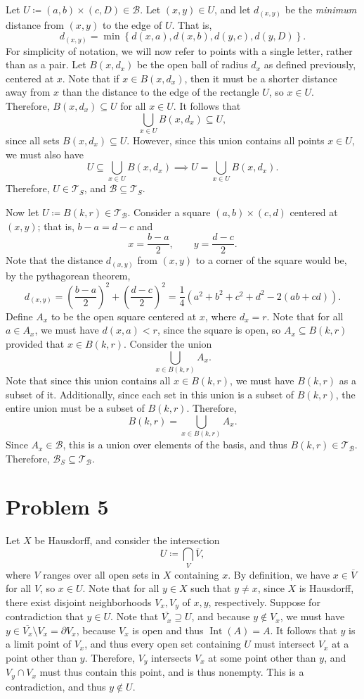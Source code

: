 \documentclass[11pt, letterpaper]{article}
\DeclareMathOperator{\Int}{Int}
\begin{document}
Let $U\coloneqq (a,b)\times (c,D)\in \mathcal{B}  $. Let $(x,y)\in U$, and let $d_{(x,y)} $ be the \emph{minimum} distance from $(x,y)$ to the edge of $U$. That is,
\[
	d_{(x,y)} = \min \left\{ d(x,a),d(x,b),d(y,c),d(y,D) \right\} 
.\]
For simplicity of notation, we will now refer to points with a single letter, rather than as a pair. Let $B(x,d_x)$ be the open ball of radius $d_x$ as defined previously, centered at $x$. Note that if $x\in B(x,d_x)$, then it must be a shorter distance away from $x$ than the distance to the edge of the rectangle $U$, so $x\in U$. Therefore, $B(x,d_x)\subseteq U$ for all $x\in U$. It follows that
\[
	\bigcup_{x\in U} B(x,d_x) \subseteq U
,\]
since all sets $B(x,d_x)\subseteq U$. However, since this union contains all points $x\in U$, we must also have
\[
	U\subseteq \bigcup_{x\in U} B(x,d_x) \implies U=\bigcup_{x\in U} B(x,d_x)
.\]
Therefore, $U\in \mathcal{T}_S$, and $\mathcal{B} \subseteq \mathcal{T}_S$.

Now let $U\coloneqq B(k,r)\in \mathcal{T}_{\mathcal{B} } $. Consider a square $(a,b)\times (c,d)$ centered at $(x,y)$; that is, $b-a=d-c$ and
\[
	x=\frac{b-a}{2} ,\qquad y=\frac{d-c}{2} 
.\]
Note that the distance $d_{(x,y)} $ from $(x,y)$ to a corner of the square would be, by the pythagorean theorem,
\[
	d_{(x,y)}  = \left( \frac{b-a}{2}  \right)^2  + \left( \frac{d-c}{2}  \right) ^2 = \frac{1}{4} \left( a^2+b^2+c^2+d^2-2(ab+cd) \right)
.\]
Define $A_{x} $ to be the open square centered at $x$, where $d_x=r$. Note that for all $a\in A_{x} $, we must have $d(x,a)<r$, since the square is open, so $A_{x} \subseteq B(k,r)$ provided that $x\in B(k,r)$. Consider the union
\[
	\bigcup_{x\in B(k,r)} A_x
.\]
Note that since this union contains all $x\in B(k,r)$, we must have $B(k,r)$ as a subset of it. Additionally, since each set in this union is a subset of $B(k,r)$, the entire union must be a subset of $B(k,r)$. Therefore,
\[
	B(k,r)=\bigcup_{x\in B(k,r)} A_x
.\]
Since $A_x\in \mathcal{B} $, this is a union over elements of the basis, and thus $B(k,r)\in \mathcal{T}_{\mathcal{B} } $. Therefore, $\mathcal{B}_S \subseteq \mathcal{T}_{\mathcal{B} } $.
\section*{Problem 5}
Let $X$ be Hausdorff, and consider the intersection
\[
	U\coloneqq \bigcap_{V} \overline{V} 
,\]
where $V$ ranges over all open sets in $X$ containing $x$. By definition, we have $x\in \overline{V} $ for all $V$, so $x\in U$. Note that for all $y\in X$ such that $y\neq x$, since $X$ is Hausdorff, there exist disjoint neighborhoods $V_x,V_y$ of $x,y$, respectively. Suppose for contradiction that $y\in U$. Note that $\overline{V_x} \supseteq U$, and because $y\notin V_x$, we must have $y\in \overline{V_x} \setminus V_x=\partial V_x$, because $V_x$ is open and thus $\Int(A)=A$. It follows that $y$ is a limit point of $V_x$, and thus every open set containing $U$ must intersect $V_x$ at a point other than $y$. Therefore, $V_y$ intersects $V_x$ at some point other than $y$, and $V_y \cap V_x$ must thus contain this point, and is thus nonempty. This is a contradiction, and thus $y\notin U$.
\end{document}
